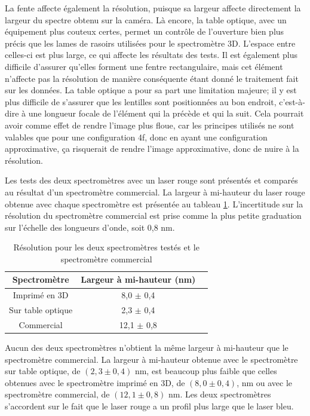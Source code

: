 \documentclass[11pt,letterpaper]{article}
\begin{document}
La fente affecte également la résolution, puisque sa largeur affecte directement la largeur du spectre
obtenu sur la caméra. Là encore, la table optique, avec un équipement plus couteux certes, permet un
contrôle de l'ouverture bien plus précis que les lames de rasoirs utilisées pour le spectromètre 3D.
L'espace entre celles-ci est plus large, ce qui affecte les résultats des tests. Il est également 
plus difficile d'assurer qu'elles forment une fentre rectangulaire, mais cet élément n'affecte pas 
la résolution de manière conséquente étant donné le traitement fait sur les données.
La table optique a pour sa part une limitation majeure; il y est plus difficile de s'assurer que les
lentilles sont positionnées au bon endroit, c'est-à-dire à une longueur focale de l'élément qui la 
précède et qui la suit. Cela pourrait avoir comme effet de rendre l'image plus floue, car les principes
utilisés ne sont valables que pour une configuration 4f, donc en ayant une configuration approximative,
ça risquerait de rendre l'image approximative, donc de nuire à la résolution. 

Les tests des deux spectromètres avec un laser rouge sont présentés et comparés au résultat d'un 
spectromètre commercial. La largeur à mi-hauteur du laser rouge obtenue avec chaque spectromètre est 
présentée au tableau \ref{res_tab_rouge}. L'incertitude sur la résolution du spectromètre commercial 
est prise comme la plus petite graduation sur l'échelle des longueurs d'onde, soit 0,8 nm.

\begin{table}[H]
  \centering
  \begin{tabular}{|c|c|c|}\hline
    Spectromètre & Largeur à mi-hauteur (nm) \\
    \hline
    Imprimé en 3D & 8,0 $\pm$ 0,4\\    \hline
    Sur table optique & 2,3 $\pm$ 0,4\\    \hline
    Commercial & 12,1 $\pm$ 0,8\\    \hline
  \end{tabular}
  \caption{Résolution pour les deux spectromètres testés et le spectromètre commercial}
  \label{res_tab_rouge}
\end{table}

Aucun des deux spectromètres n'obtient la même largeur à mi-hauteur que le spectromètre commercial.
La largeur à mi-hauteur obtenue avec le spectromètre sur table optique, de $(2,3 \pm 0,4)$ nm, est 
beaucoup plus faible que celles obtenues avec le spectromètre imprimé en 3D, de $(8,0 \pm 0,4)$, nm 
ou avec le spectromètre commercial, de $(12,1 \pm 0,8)$ nm. Les deux spectromètres s'accordent sur 
le fait que le laser rouge a un profil plus large que le laser bleu.
\end{document}
